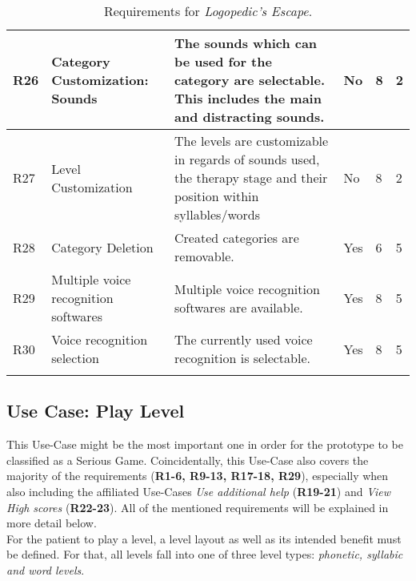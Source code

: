 \documentclass[draft,final]{vutinfth} %
\begin{document}
\begin{longtable}[h]{|p{}|p{}|p{}|p{}|p{}|p{}|}
R26 & Category Customization: Sounds & The sounds which can be used for the category are selectable. This includes the main and distracting sounds. & No & 8 & 2\\ \hline
R27 & Level Customization & The levels are customizable in regards of sounds used, the therapy stage and their position within syllables/words & No & 8  &2\\ \hline
R28 & Category Deletion & Created categories are removable. & Yes & 6 & 5\\ \hline
R29 & Multiple voice recognition softwares & Multiple voice recognition softwares are available. & Yes & 8 &5\\ \hline
R30 & Voice recognition selection &  The currently used  voice recognition is selectable. & Yes & 8 &5\\ \hline



\caption{Requirements for \emph{Logopedic's Escape}.}
\label{tbl:requirements}
\end{longtable}

\subsection{Use Case: Play Level}
\label{sec:playLevel}
This Use-Case might be the most important one in order for the prototype to be classified as a Serious Game. Coincidentally, this Use-Case also covers the majority of the requirements (\textbf{R1-6, R9-13, R17-18, R29}), especially when also including the affiliated Use-Cases \emph{Use additional help} (\textbf{R19-21}) and \emph{View High scores} (\textbf{R22-23}). All of the mentioned requirements will be explained in more detail below. \\
For the patient to play a level, a level layout as well as its intended benefit must be defined. For that, all levels fall into one of three level types: \emph{phonetic, syllabic and word levels}.
\end{document}
